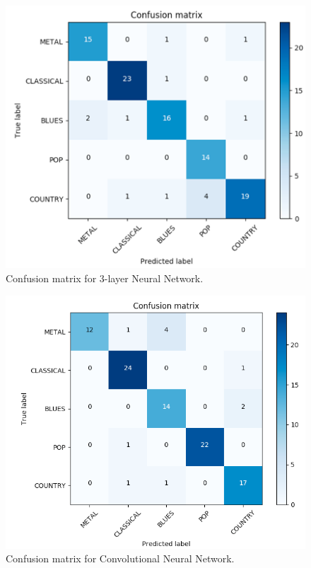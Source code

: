 \begin{figure}
\begin{center}
\includegraphics[scale=0.3]{./figures/confusion_simple_NN.png}
\end{center}
\caption
{
Confusion matrix for 3-layer Neural Network.
}
\label{fig:big_picture5}
\end{figure}

\begin{figure}
\begin{center}
\includegraphics[scale=0.2]{./figures/confusion_cnn.png}
\end{center}
\caption
{
Confusion matrix for Convolutional Neural Network.
}
\label{fig:big_picture5}
\end{figure}

